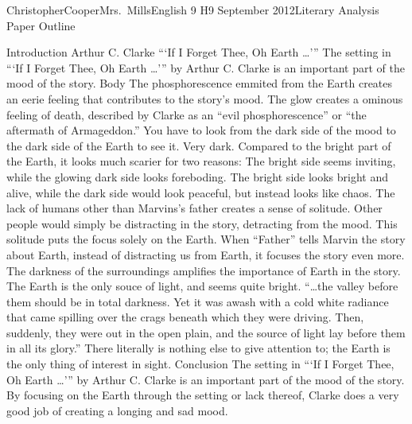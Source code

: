 \documentclass[12pt,letterpaper]{article}
\begin{document}
\begin{mla}{Christopher}{Cooper}{Mrs.\ Mills}{English 9 H}{9 September 2012}{Literary Analysis Paper Outline}

\begin{outline}[enumerate]
\1 Introduction
   \2 Arthur C. Clarke
   \2 ``\thinspace`If I Forget Thee, Oh Earth \dots'\thinspace''
   \2 The setting in ``\thinspace`If I Forget Thee, Oh Earth \dots'\thinspace'' by 
   Arthur C. Clarke is an important part of the mood of the story.
\1 Body
   \2 The phosphorescence emmited from the Earth creates an eerie
   feeling that contributes to the story's mood.
      \3 The glow creates a ominous feeling of death, described by Clarke as an 
      ``evil phosphorescence'' or ``the aftermath of Armageddon.''
      \3 You have to look from the dark side of the mood to the 
      dark side of the Earth to see it. Very dark.
      \3 Compared to the bright part of the Earth, it looks much 
      scarier for two reasons:
         \4 The bright side seems inviting, while the glowing dark
         side looks foreboding.
         \4 The bright side looks bright and alive, while the 
         dark side would look peaceful, but instead looks like chaos.
   \2 The lack of humans other than Marvins's father 
   creates a sense of solitude.
      \3 Other people would simply be distracting in the story, 
      detracting from the mood.
      \3 This solitude puts the focus solely on the Earth.
      \3 When ``Father'' tells Marvin the story about Earth, 
      instead of distracting us from Earth, it focuses the story even more.
   \2 The darkness of the surroundings amplifies the importance
   of Earth in the story.
      \3 The Earth is the only souce of light, and seems quite bright.
      \3 ``\dots the valley before them should be in total darkness.
      Yet it was awash with a cold white radiance that came spilling 
      over the crags beneath which they were driving. Then, 
      suddenly, they were out in the open plain, and the source 
      of light lay before them in all its glory.''
      \3 There literally is nothing else to give attention
      to; the Earth is the only thing of interest in sight.
\1 Conclusion
   \2 The setting in ``\thinspace`If I Forget Thee, Oh Earth \dots'\thinspace'' by 
   Arthur C. Clarke is an important part of the mood of the story.
   \2 By focusing on the Earth through the setting or lack thereof, 
   Clarke does a very good job of creating a longing and sad mood.
\end{outline}



\end{mla}
\end{document}
